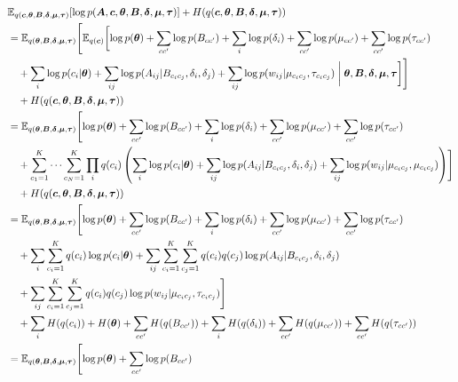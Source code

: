 \documentclass{article}
\renewcommand{\v}[1]{\bm{#1}}
\newcommand{\E}{\mathbb{E}}
\begin{document}
\begin{equation}
\begin{aligned}
& \E_{q(\v{c}, \v{\theta}, \v{B}, \v{\delta}, \v{\mu}, \v{\tau})}[\log p(\v{A}, \v{c}, \v{\theta}, \v{B}, \v{\delta}, \v{\mu}, \v{\tau})] 
+ H(q(\v{c}, \v{\theta}, \v{B},\v{\delta}, \v{\mu}, \v{\tau})) \\ 
&= \E_{q(\v{\theta}, \v{B},\v{\delta},  \v{\mu}, \v{\tau})} \Biggl[ 
\E_{q(\v{c})} \biggl[ \log p(\v{\theta}) 
+ \sum_{cc'} \log p(B_{cc'}) 
+ \sum_i \log p(\delta_i) 
+ \sum_{cc'} \log p(\mu_{cc'}) 
+ \sum_{cc'} \log p(\tau_{cc'})\\
& \quad + \sum_i \log p(c_i | \v{\theta}) 
+ \sum_{ij} \log p(A_{ij} | B_{c_ic_j}, \delta_i, \delta_j) 
+ \sum_{ij} \log p(w_{ij} | \mu_{c_ic_j}, \tau_{c_ic_j}) \biggm\vert \v{\theta}, \v{B}, \v{\delta}, \v{\mu}, \v{\tau} \biggr] \Biggr]\\ 
& \quad + H(q(\v{c}, \v{\theta}, \v{B}, \v{\delta}, \v{\mu}, \v{\tau})) \\
&= \E_{q(\v{\theta}, \v{B},\v{\delta}, \v{\mu}, \v{\tau})}\Biggl[ 
\log p(\v{\theta}) 
+ \sum_{cc'} \log p(B_{cc'}) 
+ \sum_i \log p(\delta_i) 
+ \sum_{cc'} \log p(\mu_{cc'}) 
+ \sum_{cc'} \log p(\tau_{cc'})\\
& \quad + \sum_{c_1=1}^K \cdots \sum_{c_N=1}^K \prod_i q(c_i) \left( \sum_i \log p(c_i | \v{\theta}) 
+ \sum_{ij} \log p(A_{ij} | B_{c_ic_j}, \delta_i, \delta_j) 
+ \sum_{ij} \log p(w_{ij} | \mu_{c_ic_j}, \mu_{c_ic_j})\right) \Biggr]\\ 
& \quad + H(q(\v{c}, \v{\theta}, \v{B},\v{\delta}, \v{\mu}, \v{\tau})) \\
&= \E_{q(\v{\theta}, \v{B},\v{\delta}, \v{\mu}, \v{\tau})}\Biggl[ 
\log p(\v{\theta}) 
+ \sum_{cc'} \log p(B_{cc'}) 
+ \sum_i \log p(\delta_i) 
+ \sum_{cc'} \log p(\mu_{cc'}) 
+ \sum_{cc'} \log p(\tau_{cc'})\\
& \quad + \sum_i \sum_{c_i=1}^K q(c_i) \log p(c_i | \v{\theta}) 
+ \sum_{ij} \sum_{c_i=1}^K \sum_{c_j=1}^K q(c_i) q(c_j) \log p(A_{ij} | B_{c_ic_j}, \delta_i, \delta_j)\\
& \quad + \sum_{ij} \sum_{c_i=1}^K \sum_{c_j=1}^K q(c_i) q(c_j) \log p(w_{ij} | \mu_{c_ic_j}, \tau_{c_ic_j})\Biggr]\\
& \quad + \sum_i H(q(c_i)) 
+ H(\v{\theta}) 
+ \sum_{cc'} H(q(B_{cc'})) 
+ \sum_{i} H(q(\delta_i)) 
+ \sum_{cc'} H(q(\mu_{cc'})) 
+ \sum_{cc'} H(q(\tau_{cc'})) \\
&= \E_{q(\v{\theta}, \v{B},\v{\delta}, \v{\mu}, \v{\tau})}\Biggl[ 
\log p(\v{\theta}) 
+ \sum_{cc'} \log p(B_{cc'}) 

\end{aligned}
\end{equation}
\end{document}
